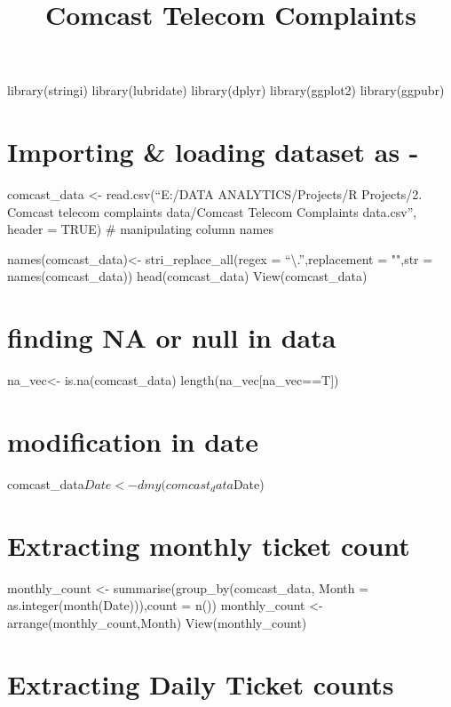 \documentclass[
]{article}
\title{Comcast Telecom Complaints}
\author{}
\date{\vspace{-2.5em}}
\begin{document}
\maketitle

library(stringi) library(lubridate) library(dplyr) library(ggplot2)
library(ggpubr)

\hypertarget{importing-loading-dataset-as--}{%
\section{Importing \& loading dataset as
-}\label{importing-loading-dataset-as--}}

comcast\_data \textless- read.csv(``E:/DATA ANALYTICS/Projects/R
Projects/2. Comcast telecom complaints data/Comcast Telecom Complaints
data.csv'', header = TRUE) \# manipulating column names

names(comcast\_data)\textless- stri\_replace\_all(regex =
``\textbackslash.'',replacement = "",str = names(comcast\_data))
head(comcast\_data) View(comcast\_data)

\hypertarget{finding-na-or-null-in-data}{%
\section{finding NA or null in data}\label{finding-na-or-null-in-data}}

na\_vec\textless- is.na(comcast\_data) length(na\_vec{[}na\_vec==T{]})

\hypertarget{modification-in-date}{%
\section{modification in date}\label{modification-in-date}}

comcast\_data\(Date<- dmy(comcast_data\)Date)

\hypertarget{extracting-monthly-ticket-count}{%
\section{Extracting monthly ticket
count}\label{extracting-monthly-ticket-count}}

monthly\_count \textless- summarise(group\_by(comcast\_data, Month =
as.integer(month(Date))),count = n()) monthly\_count \textless-
arrange(monthly\_count,Month) View(monthly\_count)

\hypertarget{extracting-daily-ticket-counts}{%
\section{Extracting Daily Ticket
counts}\label{extracting-daily-ticket-counts}}
\end{document}

